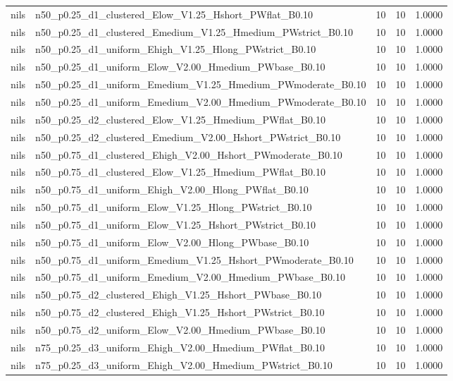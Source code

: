 \begin{tabular}{llrrr}
nils & n50_p0.25_d1_clustered_Elow_V1.25_Hshort_PWflat_B0.10 & 10 & 10 & 1.0000 \\
nils & n50_p0.25_d1_clustered_Emedium_V1.25_Hmedium_PWstrict_B0.10 & 10 & 10 & 1.0000 \\
nils & n50_p0.25_d1_uniform_Ehigh_V1.25_Hlong_PWstrict_B0.10 & 10 & 10 & 1.0000 \\
nils & n50_p0.25_d1_uniform_Elow_V2.00_Hmedium_PWbase_B0.10 & 10 & 10 & 1.0000 \\
nils & n50_p0.25_d1_uniform_Emedium_V1.25_Hmedium_PWmoderate_B0.10 & 10 & 10 & 1.0000 \\
nils & n50_p0.25_d1_uniform_Emedium_V2.00_Hmedium_PWmoderate_B0.10 & 10 & 10 & 1.0000 \\
nils & n50_p0.25_d2_clustered_Elow_V1.25_Hmedium_PWflat_B0.10 & 10 & 10 & 1.0000 \\
nils & n50_p0.25_d2_clustered_Emedium_V2.00_Hshort_PWstrict_B0.10 & 10 & 10 & 1.0000 \\
nils & n50_p0.75_d1_clustered_Ehigh_V2.00_Hshort_PWmoderate_B0.10 & 10 & 10 & 1.0000 \\
nils & n50_p0.75_d1_clustered_Elow_V1.25_Hmedium_PWflat_B0.10 & 10 & 10 & 1.0000 \\
nils & n50_p0.75_d1_uniform_Ehigh_V2.00_Hlong_PWflat_B0.10 & 10 & 10 & 1.0000 \\
nils & n50_p0.75_d1_uniform_Elow_V1.25_Hlong_PWstrict_B0.10 & 10 & 10 & 1.0000 \\
nils & n50_p0.75_d1_uniform_Elow_V1.25_Hshort_PWstrict_B0.10 & 10 & 10 & 1.0000 \\
nils & n50_p0.75_d1_uniform_Elow_V2.00_Hlong_PWbase_B0.10 & 10 & 10 & 1.0000 \\
nils & n50_p0.75_d1_uniform_Emedium_V1.25_Hshort_PWmoderate_B0.10 & 10 & 10 & 1.0000 \\
nils & n50_p0.75_d1_uniform_Emedium_V2.00_Hmedium_PWbase_B0.10 & 10 & 10 & 1.0000 \\
nils & n50_p0.75_d2_clustered_Ehigh_V1.25_Hshort_PWbase_B0.10 & 10 & 10 & 1.0000 \\
nils & n50_p0.75_d2_clustered_Ehigh_V1.25_Hshort_PWstrict_B0.10 & 10 & 10 & 1.0000 \\
nils & n50_p0.75_d2_uniform_Elow_V2.00_Hmedium_PWbase_B0.10 & 10 & 10 & 1.0000 \\
nils & n75_p0.25_d3_uniform_Ehigh_V2.00_Hmedium_PWflat_B0.10 & 10 & 10 & 1.0000 \\
nils & n75_p0.25_d3_uniform_Ehigh_V2.00_Hmedium_PWstrict_B0.10 & 10 & 10 & 1.0000 \\

\end{tabular}
